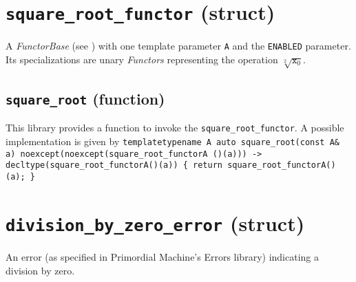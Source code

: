 \documentclass[oneside]{book}
\begin{document}











\section{\texttt{square\_root\_functor} (struct)}
A \textit{FunctorBase} (see \cite{functors}) with one template parameter \texttt{A} and the
\texttt{ENABLED} parameter. Its specializations are unary  \textit{Functors}   representing
the operation $\sqrt[2]{\texttt{x}_0}$.\newline

\subsection{\texttt{square\_root} (function)}
This library provides a function to invoke the \texttt{square\_root\_functor}.
A possible implementation is given by\newline
\texttt{template\textlangle typename A\textrangle\newline
auto\newline
square\_root(const A\& a)\newline
noexcept(noexcept(square\_root\_functor\textlangle A \textrangle()(a)))\newline
-> decltype(square\_root\_functor\textlangle A\textrangle()(a))\newline
\{ return square\_root\_functor\textlangle A\textrangle()(a); \}}

\section{\texttt{division\_by\_zero\_error} (struct)}
An error (as specified in Primordial Machine's Errors library) indicating a division by zero.
\end{document}
